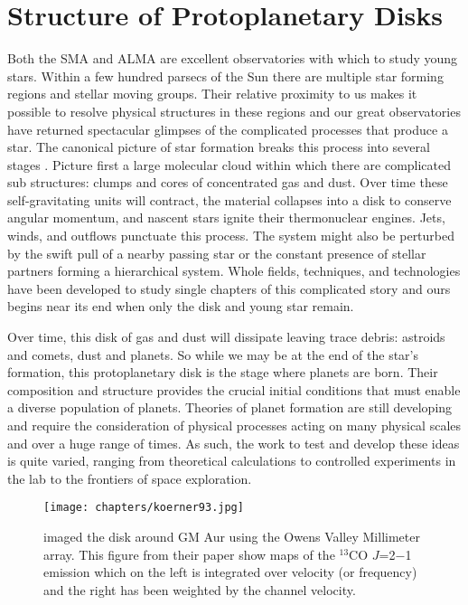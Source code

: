 \section{Structure of Protoplanetary Disks}

Both the SMA and ALMA are excellent observatories with which to study young stars.  Within a few hundred parsecs 
of the Sun there are multiple star forming regions and stellar moving groups.  Their relative proximity to us 
makes it possible to resolve physical structures in these regions and our great observatories have returned 
spectacular glimpses of the complicated processes that produce a star.  The canonical picture of star formation 
breaks this process into several stages \citep{shu87,mckee07}.  Picture first a large 
molecular cloud within which there are complicated sub structures: clumps and cores of 
concentrated gas and dust.  Over time these self-gravitating units will contract,  the material collapses into 
a disk to conserve angular momentum, and nascent stars ignite their thermonuclear engines.  Jets, winds, and 
outflows punctuate this process.  The system might also be perturbed by the swift pull of a nearby passing star 
or the constant presence of stellar partners forming a hierarchical system.  Whole fields, techniques, and 
technologies have been developed to study single chapters of this 
complicated story and ours begins near its end when only the disk and young star remain.

Over time, this disk of gas and dust will dissipate leaving trace debris: astroids and comets, dust and planets.
So while we may be at the end of the star's formation, this protoplanetary disk is the stage where planets are
born.  Their composition and structure provides the crucial initial conditions that must enable a diverse 
population of planets.  Theories of planet formation are still developing and require the consideration 
of physical processes acting on many physical scales and over a huge range of times.  As such, the
work to test and develop these ideas is quite varied, ranging from theoretical calculations to controlled 
experiments in the lab to the frontiers of space exploration.

\begin{figure}[t]
\vspace{4cm}
\texttt{[image: chapters/koerner93.jpg]}
\caption{\citet{koerner93} imaged the disk around GM Aur using the Owens Valley Millimeter array. This figure
from their paper 
show maps of the $^{13}$CO $J$=2$-$1 emission which on the left is integrated over velocity (or frequency) and 
the right has been weighted by the channel velocity.}
\end{figure}

